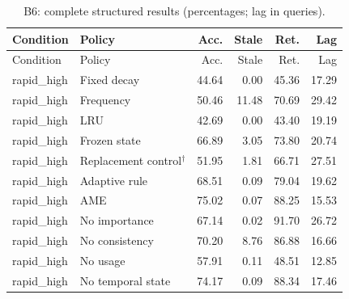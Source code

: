 \begin{longtable}{llrrrr}\caption{B6: complete structured results (percentages; lag in queries).}\label{tab:B6}\\\toprule Condition & Policy & Acc. & Stale & Ret. & Lag\\\midrule\endfirsthead\toprule Condition & Policy & Acc. & Stale & Ret. & Lag\\\midrule\endhead
rapid\_high & Fixed decay & 44.64 & 0.00 & 45.36 & 17.29\\
rapid\_high & Frequency & 50.46 & 11.48 & 70.69 & 29.42\\
rapid\_high & LRU & 42.69 & 0.00 & 43.40 & 19.19\\
rapid\_high & Frozen state & 66.89 & 3.05 & 73.80 & 20.74\\
rapid\_high & Replacement control$^{\dagger}$ & 51.95 & 1.81 & 66.71 & 27.51\\
rapid\_high & Adaptive rule & 68.51 & 0.09 & 79.04 & 19.62\\
rapid\_high & AME & 75.02 & 0.07 & 88.25 & 15.53\\
rapid\_high & No importance & 67.14 & 0.02 & 91.70 & 26.72\\
rapid\_high & No consistency & 70.20 & 8.76 & 86.88 & 16.66\\
rapid\_high & No usage & 57.91 & 0.11 & 48.51 & 12.85\\
rapid\_high & No temporal state & 74.17 & 0.09 & 88.34 & 17.46\\
\bottomrule\end{longtable}